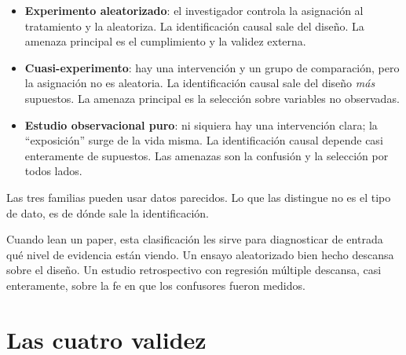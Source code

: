 \documentclass[
  letterpaper,
  DIV=11,
  numbers=noendperiod,
  oneside]{scrreprt}
\begin{document}
\begin{tcolorbox}[enhanced jigsaw, breakable, rightrule=.15mm, colbacktitle=quarto-callout-tip-color!10!white, bottomtitle=1mm, arc=.35mm, titlerule=0mm, left=2mm, toprule=.15mm, leftrule=.75mm, colback=white, opacitybacktitle=0.6, opacityback=0, colframe=quarto-callout-tip-color-frame, bottomrule=.15mm, coltitle=black, toptitle=1mm, title=\textcolor{quarto-callout-tip-color}{\faLightbulb}\hspace{0.5em}{Tip}]

\begin{itemize}
\item
  \textbf{Experimento aleatorizado}: el investigador controla la
  asignación al tratamiento y la aleatoriza. La identificación causal
  sale del diseño. La amenaza principal es el cumplimiento y la validez
  externa.
\item
  \textbf{Cuasi-experimento}: hay una intervención y un grupo de
  comparación, pero la asignación no es aleatoria. La identificación
  causal sale del diseño \emph{más} supuestos. La amenaza principal es
  la selección sobre variables no observadas.
\item
  \textbf{Estudio observacional puro}: ni siquiera hay una intervención
  clara; la ``exposición'' surge de la vida misma. La identificación
  causal depende casi enteramente de supuestos. Las amenazas son la
  confusión y la selección por todos lados.
\end{itemize}

Las tres familias pueden usar datos parecidos. Lo que las distingue no
es el tipo de dato, es de dónde sale la identificación.

\end{tcolorbox}

Cuando lean un paper, esta clasificación les sirve para diagnosticar de
entrada qué nivel de evidencia están viendo. Un ensayo aleatorizado bien
hecho descansa sobre el diseño. Un estudio retrospectivo con regresión
múltiple descansa, casi enteramente, sobre la fe en que los confusores
fueron medidos.

\hypertarget{las-cuatro-validez}{%
\section{Las cuatro validez}\label{las-cuatro-validez}}
\end{document}
